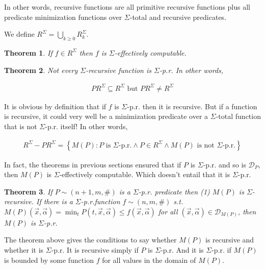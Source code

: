 \documentclass[a4paper, 12pt]{article}
\newtheorem{theorem}{Theorem}
\newtheorem{theorem}{Theorem}
\begin{document}
In other words, recursive functions are all primitive recursive functions plus
all predicate minimization functions over $\Sigma$-total and recursive
predicates.

We define $R^{\Sigma} = \bigcup_{k\geq 0} R_{k}^{\Sigma}$.

\begin{theorem}
    If $f \in R^{\Sigma}$ then $f$ is $\Sigma$-effectively computable.
\end{theorem}

\begin{theorem}
    Not every $\Sigma$-recursive function is $\Sigma$-p.r. In other words, 

    \begin{align*}
        PR^{\Sigma} \subseteq R^{\Sigma} \text{ but } PR^{\Sigma} \neq R^{\Sigma}
    \end{align*}
\end{theorem}

It is obvious by definition that if $f$ is $\Sigma$-p.r. then it is recursive.
But if a function is recursive, it could very well be a minimization predicate
over a $\Sigma$-total function that is not $\Sigma$-p.r. itself! In other words, 

\begin{align*}
    R^{\Sigma} - PR^{\Sigma} = \left\{ M(P) : P \text{ is $\Sigma$-p.r.}  \land
    P \in R^{\Sigma} \land M(P) \text{ is not $\Sigma$-p.r.} \right\} 
\end{align*}

In fact, the theorems in previous sections ensured that if $P$ is $\Sigma$-p.r.
and so is $\mathcal{D}_P$, then $M(P)$ is $\Sigma$-effectively computable. Which
doesn't entail that it is $\Sigma$-p.r.

\begin{theorem}
    If $P \sim (n+1, m, \#)$ is a $\Sigma$-p.r. predicate then \textit{(1)} $M(P)$ is
    $\Sigma$-recursive. If there is a $\Sigma$-p.r.function $f \sim (n, m, \#)$
    s.t. $M(P)(\overrightarrow{x}, \overrightarrow{\alpha}) = \min_t P(t,
    \overrightarrow{x},  \overrightarrow{\alpha}) \leq f(\overrightarrow{x},
    \overrightarrow{\alpha})$ for all $(\overrightarrow{x},
    \overrightarrow{\alpha}) \in \mathcal{D}_{M(P)}$, then $M(P)$ is $\Sigma$-p.r.
\end{theorem}

The theorem above gives the conditions to say whether $M(P)$ is recursive and
whether it is $\Sigma$-p.r. It is recursive simply if $P$ is $\Sigma$-p.r. And
it is $\Sigma$-p.r. if $M(P)$ is bounded by some function $f$ for all values in
the domain of $M(P)$. 
\end{document}
